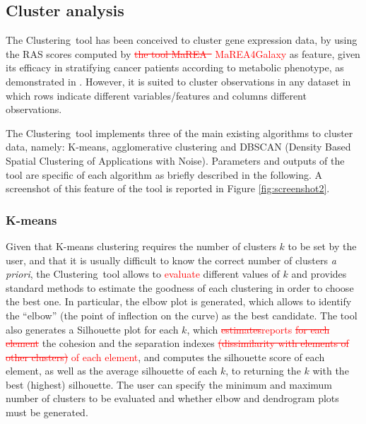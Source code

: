 \documentclass[preprint,12pt,authoryear]{elsarticle}
\newcommand{\red}{\textcolor{red}}
\newcommand{\mareagalaxy}{\textsf{MaREA4Galaxy}}
\newcommand{\mareaTool}{\textsf{MaREA}}
\newcommand{\clusterTool}{\textsf{Clustering}}
\begin{document}
\subsection{Cluster analysis}
The \clusterTool~tool has been conceived to cluster gene expression data, by using the RAS scores computed by \red{\sout{the tool \mareaTool~} \mareagalaxy} as feature, given its efficacy in stratifying cancer patients according to metabolic phenotype, as demonstrated in \citep{marea}. However, it is suited to cluster observations in any dataset in which rows indicate different variables/features and columns different observations. 

The \clusterTool~tool implements three of the main existing algorithms to cluster data, namely: K-means, agglomerative clustering and DBSCAN (Density Based Spatial Clustering of Applications with Noise). Parameters and outputs of the tool are specific of each algorithm as briefly described in the following.
A screenshot of this feature of the tool is reported in Figure \ref{fig:screenshot2}.

\subsubsection{K-means}
Given that K-means clustering requires the number of clusters $k$ to be set by the user, and that it is usually difficult to know the correct number of clusters \textit{a priori}, the \clusterTool~tool allows to \red{evaluate} different values of $k$ and provides standard methods to estimate the goodness of each clustering in order to choose the best one. In particular, the elbow plot is generated, which allows to identify the “elbow” (the point of inflection on the curve) as the best candidate. The tool also generates a Silhouette plot for each $k$, which \red{\sout{estimates}reports} \red{\sout{for each element}} the cohesion and the separation indexes \red{\sout{(dissimilarity with elements of other clusters)} of each element}, and computes the silhouette score of each element, as well as the average silhouette of each $k$, to returning the $k$ with the best (highest) silhouette.
The user can specify the minimum and maximum number of clusters to be evaluated and whether elbow and dendrogram plots must be generated.
\end{document}
